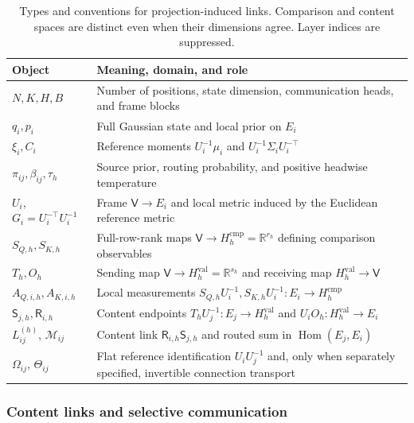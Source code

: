 \documentclass[twoside,11pt]{article}
\begin{document}
\begin{table}[t]
\centering
\small
\renewcommand{\arraystretch}{1.12}
\begin{tabularx}{\textwidth}{@{}lX@{}}
\toprule
Object & Meaning, domain, and role \\
\midrule
$N,K,H,B$ & Number of positions, state dimension, communication heads, and frame blocks \\
$q_i,p_i$ & Full Gaussian state and local prior on $E_i$ \\
$\xi_i,C_i$ & Reference moments $U_i^{-1}\mu_i$ and $U_i^{-1}\Sigma_iU_i^{-\top}$ \\
$\pi_{ij},\beta_{ij},\tau_h$ & Source prior, routing probability, and positive headwise temperature \\

$U_i$, $G_i=U_i^{-\top}U_i^{-1}$ & Frame $\mathsf V\to E_i$ and local metric induced by the Euclidean reference metric \\
$S_{Q,h},S_{K,h}$ & Full-row-rank maps $\mathsf V\to H_h^{\mathrm{cmp}}=\mathbb R^{r_h}$ defining comparison observables \\
$T_h,O_h$ & Sending map $\mathsf V\to H_h^{\mathrm{val}}=\mathbb R^{s_h}$ and receiving map $H_h^{\mathrm{val}}\to\mathsf V$ \\
$A_{Q,i,h},A_{K,i,h}$ & Local measurements $S_{Q,h}U_i^{-1},S_{K,h}U_i^{-1}:E_i\to H_h^{\mathrm{cmp}}$ \\
$\mathsf S_{j,h},\mathsf R_{i,h}$ & Content endpoints $T_hU_j^{-1}:E_j\to H_h^{\mathrm{val}}$ and $U_iO_h:H_h^{\mathrm{val}}\to E_i$ \\
$L_{ij}^{(h)}$, $\mathcal M_{ij}$ & Content link $\mathsf R_{i,h}\mathsf S_{j,h}$ and routed sum in $\operatorname{Hom}(E_j,E_i)$ \\
$\Omega_{ij}$, $\Theta_{ij}$ & Flat reference identification $U_iU_j^{-1}$ and, only when separately specified, invertible connection transport \\
\bottomrule
\end{tabularx}
\caption{Types and conventions for projection-induced links. Comparison and content spaces are distinct even when their dimensions agree. Layer indices are suppressed.}
\label{tab:link_conventions}
\end{table}

\subsubsection{Content links and selective communication}
\end{document}
